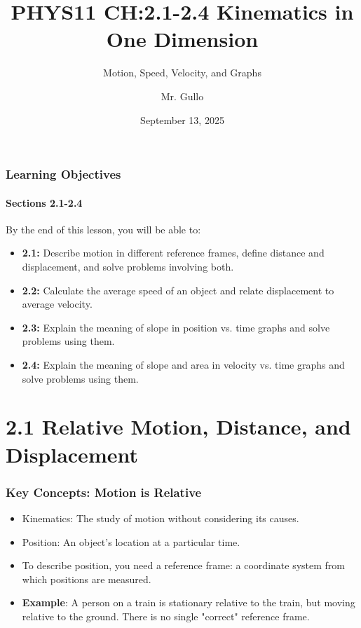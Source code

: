 \documentclass{beamer}
\title[Short Title]{PHYS11 CH:2.1-2.4 Kinematics in One Dimension}
\subtitle{Motion, Speed, Velocity, and Graphs}
\author[Mr. Gullo]{Mr. Gullo}
\date[Sep 13, 2025]{September 13, 2025}
\begin{document}
\frame{\titlepage}

\begin{frame}
\frametitle{Learning Objectives}
\framesubtitle{Sections 2.1-2.4}
\begin{block}{By the end of this lesson, you will be able to:}
    \begin{itemize}
        \item \textbf{2.1:} Describe motion in different reference frames, define distance and displacement, and solve problems involving both. \pause
        \item \textbf{2.2:} Calculate the average speed of an object and relate displacement to average velocity. \pause
        \item \textbf{2.3:} Explain the meaning of slope in position vs. time graphs and solve problems using them. \pause
        \item \textbf{2.4:} Explain the meaning of slope and area in velocity vs. time graphs and solve problems using them.
    \end{itemize}
\end{block}
\end{frame}

\section{2.1 Relative Motion, Distance, and Displacement}

\begin{frame}
\frametitle{Key Concepts: Motion is Relative}
\begin{itemize}
    \item \alert{Kinematics}: The study of motion without considering its causes. \pause
    \item \alert{Position}: An object's location at a particular time. \pause
    \item To describe position, you need a \alert{reference frame}: a coordinate system from which positions are measured. \pause
    \item \textbf{Example}: A person on a train is stationary relative to the train, but moving relative to the ground. There is no single "correct" reference frame.
\end{itemize}
\end{frame}
\end{document}
